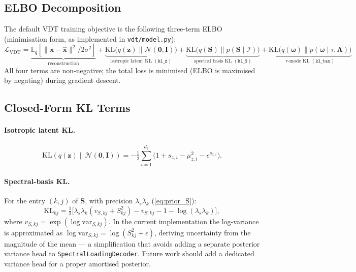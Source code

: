 \documentclass[11pt,a4paper]{article}
\newcommand{\E}{\mathbb{E}}
\newcommand{\KL}{\mathrm{KL}}
\newcommand{\N}{\mathcal{N}}
\newcommand{\I}{\mathcal{I}}
\newcommand{\bLambda}{\bm{\Lambda}}
\newcommand{\bS}{\bm{S}}
\newcommand{\bz}{\bm{z}}
\newcommand{\bomega}{\bm{\omega}}
\newcommand{\bx}{\bm{x}}
\begin{document}
\subsection{ELBO Decomposition}

The default VDT training objective is the following three-term ELBO
(minimisation form, as implemented in \texttt{vdt/model.py}):
\begin{equation}
  \boxed{
  \mathcal{L}_{\mathrm{VDT}}
  = \underbrace{\E_q[\|\bx - \hat{\bx}\|^2 / 2\sigma^2]}_
      {\text{reconstruction}}
  + \underbrace{\KL\bigl(q(\bz)\|\N(\mathbf{0},\bm{I})\bigr)}_
      {\text{isotropic latent KL }(\mathtt{kl\_z})}
  + \underbrace{\KL\bigl(q(\bS)\|p(\bS\mid\I)\bigr)}_
      {\text{spectral basis KL }(\mathtt{kl\_S})}
  + \underbrace{\KL\bigl(q(\bomega)\|p(\bomega\mid\tau,\bLambda)\bigr)}_
      {\tau\text{-mode KL }(\mathtt{kl\_tau})}
  }
  \label{eq:elbo_vdt}
\end{equation}
All four terms are non-negative; the total loss is minimised (ELBO is
maximised by negating) during gradient descent.

\subsection{Closed-Form KL Terms}

\paragraph{Isotropic latent KL.}
\begin{equation}
  \KL(q(\bz)\|\N(\mathbf{0},\bm{I})) =
  -\tfrac{1}{2}\sum_{i=1}^{d_z}\!
  \bigl(1 + s_{z,i} - \mu_{z,i}^2 - e^{s_{z,i}}\bigr).
  \label{eq:kl_z}
\end{equation}

\paragraph{Spectral-basis KL.}
For the entry $(k,j)$ of $\bS$, with precision $\lambda_s\lambda_k$
(\cref{eq:prior_S}):
\begin{equation}
  \KL_{kj} = \tfrac{1}{2}\bigl[
    \lambda_s\lambda_k(v_{S,kj} + S_{kj}^2)
    - v_{S,kj} - 1 - \log(\lambda_s\lambda_k)
  \bigr],
  \label{eq:kl_S}
\end{equation}
where $v_{S,kj} = \exp(\log\mathrm{var}_{S,kj})$.  In the current
implementation the log-variance is approximated as
$\log\mathrm{var}_{S,kj} = \log(S_{kj}^2 + \epsilon)$, deriving uncertainty
from the magnitude of the mean --- a simplification that avoids adding a
separate posterior variance head to \texttt{SpectralLoadingDecoder}.
Future work should add a dedicated variance head for a proper amortised
posterior.
\end{document}
